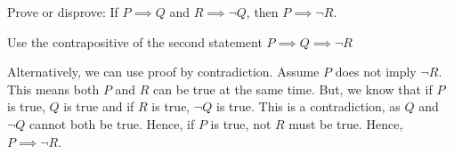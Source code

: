 \question Prove or disprove: If $P \implies Q$ and 
$R \implies \lnot Q$, then $P \implies \lnot R$.

\begin{solution}[3in]
Use the contrapositive of the second statement 
$P \implies Q \implies \neg R$

Alternatively, we can use proof by contradiction. 
Assume $P$ does not imply $\lnot R$. This means both $P$ and $R$ 
can be true at the same time. But, we know that if $P$ is true, $Q$ 
is true and if $R$ is true, $\lnot Q$ is true. This is a contradiction, 
as $Q$ and $\lnot Q$ cannot both be true. Hence, if $P$ is true, not 
$R$ must be true. Hence, $P \implies \lnot R$.
\end{solution}